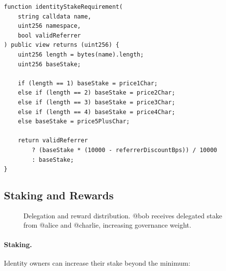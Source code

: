 \begin{lstlisting}[language=Solidity]
function identityStakeRequirement(
    string calldata name,
    uint256 namespace,
    bool validReferrer
) public view returns (uint256) {
    uint256 length = bytes(name).length;
    uint256 baseStake;

    if (length == 1) baseStake = price1Char;
    else if (length == 2) baseStake = price2Char;
    else if (length == 3) baseStake = price3Char;
    else if (length == 4) baseStake = price4Char;
    else baseStake = price5PlusChar;

    return validReferrer
        ? (baseStake * (10000 - referrerDiscountBps)) / 10000
        : baseStake;
}
\end{lstlisting}

\subsection{Staking and Rewards}

\begin{figure}[t]
\centering
{}
\caption{Delegation and reward distribution. @bob receives delegated stake from @alice and @charlie, increasing governance weight.}
\label{fig:delegation}
\end{figure}

\paragraph{Staking.} Identity owners can increase their stake beyond the minimum:

